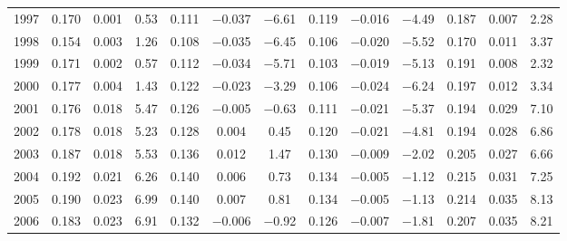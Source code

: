 {\begin{tabular}{l*{4}{ccc}}
1997        &       0.170&       0.001&        0.53&       0.111&    $-$0.037&     $-$6.61&       0.119&    $-$0.016&     $-$4.49&       0.187&       0.007&        2.28\\
1998        &       0.154&       0.003&        1.26&       0.108&    $-$0.035&     $-$6.45&       0.106&    $-$0.020&     $-$5.52&       0.170&       0.011&        3.37\\
1999        &       0.171&       0.002&        0.57&       0.112&    $-$0.034&     $-$5.71&       0.103&    $-$0.019&     $-$5.13&       0.191&       0.008&        2.32\\
2000        &       0.177&       0.004&        1.43&       0.122&    $-$0.023&     $-$3.29&       0.106&    $-$0.024&     $-$6.24&       0.197&       0.012&        3.34\\
2001        &       0.176&       0.018&        5.47&       0.126&    $-$0.005&     $-$0.63&       0.111&    $-$0.021&     $-$5.37&       0.194&       0.029&        7.10\\
2002        &       0.178&       0.018&        5.23&       0.128&       0.004&        0.45&       0.120&    $-$0.021&     $-$4.81&       0.194&       0.028&        6.86\\
2003        &       0.187&       0.018&        5.53&       0.136&       0.012&        1.47&       0.130&    $-$0.009&     $-$2.02&       0.205&       0.027&        6.66\\
2004        &       0.192&       0.021&        6.26&       0.140&       0.006&        0.73&       0.134&    $-$0.005&     $-$1.12&       0.215&       0.031&        7.25\\
2005        &       0.190&       0.023&        6.99&       0.140&       0.007&        0.81&       0.134&    $-$0.005&     $-$1.13&       0.214&       0.035&        8.13\\
2006        &       0.183&       0.023&        6.91&       0.132&    $-$0.006&     $-$0.92&       0.126&    $-$0.007&     $-$1.81&       0.207&       0.035&        8.21\\
\bottomrule
\end{tabular}
}
